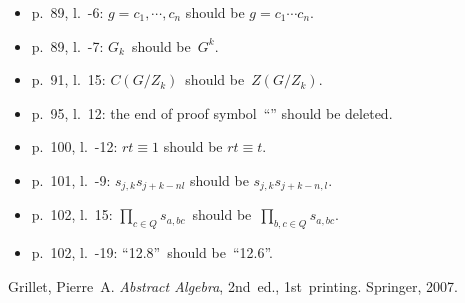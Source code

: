 \documentclass[letterpaper,12pt]{article}
\begin{document}
\begin{itemize}
\item p.~89, l.~-6: \(g=c_1,\cdots,c_n\) should be \(g=c_1\cdots c_n\).
\item p.~89, l.~-7: \(G_k\)~should be~\(G^k\).
\item p.~91, l.~15: \(C(G/Z_k)\)~should be~\(Z(G/Z_k)\).
\item p.~95, l.~12: the end of proof symbol~``\qedsymbol'' should be deleted.
\item p.~100, l.~-12: \(rt\equiv 1\) should be \(rt\equiv t\).
\item p.~101, l.~-9: \(s_{j,k}s_{j+k-nl}\) should be \(s_{j,k}s_{j+k-n,l}\).
\item p.~102, l.~15: \(\prod_{c\in Q}s_{a,bc}\)~should be~\(\prod_{b,c\in Q}s_{a,bc}\).
\item p.~102, l.~-19: ``12.8''~should be~``12.6''.
\end{itemize}

\begin{thebibliography}{0}
 Grillet, Pierre~A. \textit{Abstract Algebra}, 2nd~ed., 1st~printing. Springer, 2007.
\end{thebibliography}
\end{document}
